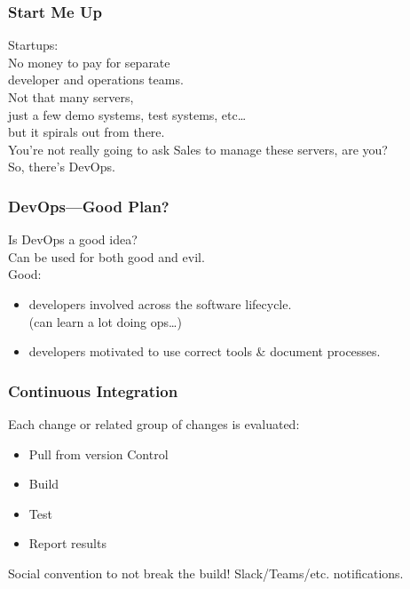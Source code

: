 \begin{frame}
\frametitle{Start Me Up}

\Large

Startups:\\[1em]
No money to pay for separate \\
developer and operations teams.\\[1em]
Not that many servers, \\
just a few demo systems, test systems, etc\ldots\\
but it spirals out from there. \\[1em]
You're not really going to ask Sales to manage these servers, are you? \\
So, there's DevOps. 


\end{frame}



\begin{frame}
\frametitle{DevOps---Good Plan?}

\large

Is DevOps a good idea? \\
Can be used for both good and evil. \\[1em]
Good:
\begin{itemize}
\item developers involved across the software lifecycle.\\
(can learn a lot doing ops\ldots )
\item developers motivated to use correct tools \& document processes.
\end{itemize}


\end{frame}



\begin{frame}
\frametitle{Continuous Integration}

Each change or related group of changes is evaluated:

\begin{itemize}
	\item Pull from version Control
	\item Build
	\item Test
	\item Report results
\end{itemize}

Social convention to not break the build! Slack/Teams/etc. notifications.

\end{frame}


